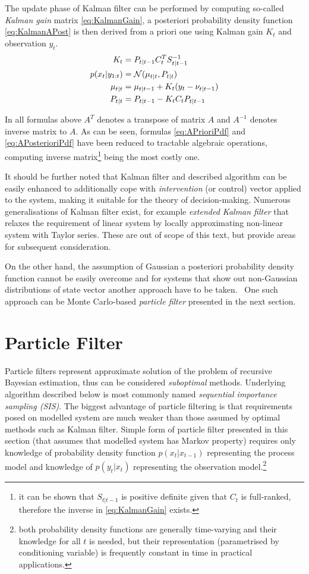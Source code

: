 \documentclass[a4paper,12pt,oneside]{report}
\newcommand{\pdf}{probability density function}
\newcommand{\pdfs}{probability density functions}
\begin{document}
The update phase of Kalman filter can be performed by computing so-called \emph{Kalman gain} matrix
\eqref{eq:KalmanGain}, a posteriori {\pdf} \eqref{eq:KalmanAPost} is then derived from a priori one
using Kalman gain \(K_t\) and observation \(y_t\).~\cite{AruMasGor:02}
\begin{align}
	K_t &= P_{t|t-1} C_t^T S_{t|t-1}^{-1} \label{eq:KalmanGain} \\[\parskip]
	p(x_t|y_{1:t}) &= \mathcal{N}(\mu_{t|t}, P_{t|t}) \label{eq:KalmanAPost} \\
	\mu_{t|t} &= \mu_{t|t-1} + K_t(y_t - \nu_{t|t-1}) \notag \\
	P_{t|t} &= P_{t|t-1} - K_t C_t P_{t|t-1} \notag
\end{align}

In all formulas above \(A^T\) denotes a transpose of matrix \(A\) and \(A^{-1}\) denotes inverse
matrix to \(A\). As can be seen, formulas \eqref{eq:APrioriPdf} and \eqref{eq:APosterioriPdf} have
been reduced to tractable algebraic operations, computing inverse matrix\footnote{it can be shown
that \(S_{t|t-1}\) is positive definite given that \(C_t\) is full-ranked,
therefore the inverse in \eqref{eq:KalmanGain} exists.} being the most costly one.

It should be further noted that Kalman filter and described algorithm can be easily enhanced to
additionally cope with \emph{intervention} (or control) vector applied to the system, making it
suitable for the theory of decision-making. Numerous generalisations of Kalman filter exist, for
example \emph{extended Kalman filter} that relaxes the requirement of linear system by locally
approximating non-linear system with Taylor series. These are out of scope of this
text, but provide areas for subsequent consideration.

On the other hand, the assumption of Gaussian a posteriori {\pdf} cannot be easily overcome and for
systems that show out non-Gaussian distributions of state vector another approach have to be
taken.~\cite{AruMasGor:02} One such approach can be Monte Carlo-based \emph{particle filter}
presented in the next section.

\section{Particle Filter}

Particle filters represent approximate solution of the problem of recursive Bayesian estimation,
thus can be considered \emph{suboptimal} methods. Underlying algorithm described below is most
commonly named \emph{sequential importance sampling (SIS)}. The biggest advantage of particle filtering
is that requirements posed on modelled system are much weaker than those assumed by optimal methods
such as Kalman filter. Simple form of particle filter presented in this section (that assumes that
modelled system has Markov property) requires only knowledge of {\pdf} \(p(x_t|x_{t-1})\)
representing the process model and knowledge of \(p(y_t|x_t)\) representing the observation
model.\footnote{both {\pdfs} are generally time-varying and their knowledge for all \(t\) is needed,
but their representation (parametrised by conditioning variable) is frequently constant in time in
practical applications.}
\end{document}

